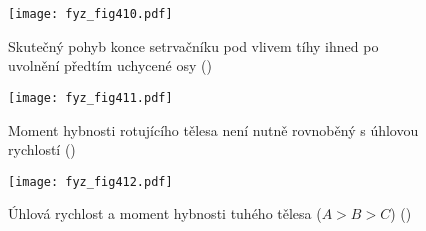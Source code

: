   \begin{figure}[ht!] %
    \centering
    \texttt{[image: fyz\_fig410.pdf]}
    \caption{Skutečný pohyb konce setrvačníku pod vlivem tíhy ihned po uvolnění předtím uchycené osy
             (\cite[s.~281]{Feynman01})}
    \label{fyz:fig410}
  \end{figure}

  \begin{figure}[ht!] %
    \centering
    \texttt{[image: fyz\_fig411.pdf]}
    \caption{Moment hybnosti rotujícího tělesa není nutně rovnoběný s úhlovou rychlostí
             (\cite[s.~282]{Feynman01})}
    \label{fyz:fig411}
  \end{figure}

  \begin{figure}[ht!] %
    \centering
    \texttt{[image: fyz\_fig412.pdf]}
    \caption{Úhlová rychlost a moment hybnosti tuhého tělesa (\(A>B>C\))
             (\cite[s.~283]{Feynman01})}
    \label{fyz:fig412}
  \end{figure}

